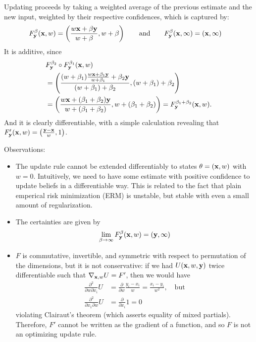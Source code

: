 \begin{subappendices}
\begin{example}
    	Updating proceeds by taking a weighted average of the previous estimate and the new input, weighted by their respective confidences, which is captured by:
    	\begin{align*}
    		F^\beta_{\mathbf y}(\mathbf x, w) &=  \left( \frac{ w \mathbf x + \beta \mathbf y}{w + \beta} , w + \beta \right)
    		\qquad\text{and}\qquad
    		F^{\beta}_{\mathbf y}(\mathbf x, \infty) = (\mathbf x, \infty)
    	\end{align*}
    	It is additive, since
    	\begin{align*}
    		&F^{\beta_2}_{\mathbf y} \circ F^{\beta_1}_{\mathbf y}(\mathbf x, w) \\
    		&= \left( \frac{ (w + \beta_1) \frac{ w \mathbf x + \beta_1 \mathbf y}{w + \beta_1} + \beta_2 \mathbf y}{(w + \beta_1) + \beta_2}, (w  + \beta_1) + \beta_2 \right) \\
    		&= \left( \frac{  w \mathbf x + (\beta_1 + \beta_2) \mathbf y}{w + (\beta_1 + \beta_2)}, w  + (\beta_1 + \beta_2)\right)
    		= F^{\beta_1 + \beta_2}_{\mathbf y}(\mathbf x, w).
    	\end{align*}
    	And it is clearly differentiable, with a simple calculation revealing that
    	$ F'_{\mathbf y}(\mathbf x, w) = \left( \frac{\mathbf y - \mathbf x}{w}, 1\right) $.

    	Observations:
    	\begin{itemize}
    		\item The update rule cannot be extended differentiably to states $\theta = (\mathbf x, w)$ with $w = 0$.
    			Intuitively, we need to have some estimate with positive confidence to update beliefs in a differentiable way.
            This is related to the fact that plain emperical risk minimization (ERM) is unstable, but stable with even a small amount of regularization.
    		\item The certainties are given by
    		\[
    			\lim_{\beta \to \infty} F^{\beta}_{\mathbf y}(\mathbf x, w) = (\mathbf y, \infty)
    		\]
    		\item $F$ is commutative, invertible, and symmetric with respect to permutation of the dimensions, but it is not conservative: if we had $U(\mathbf x, w, \mathbf y)$ twice differentiable such that $\nabla_{\mathbf x, w} U = F'$, then we would have
            \begin{align*}
            \frac{\partial^2}{\partial w \partial x_i} U &=
    			\frac\partial{\partial w} \frac{y_i - x_i}{w} = \frac{x_i - y_i}{w^2},\quad\text{but}
                \\
    		\frac{\partial^2}{\partial x_1 \partial w} U
    			&= \frac\partial{\partial x_i} 1 = 0    
            \end{align*}
    		violating Clairaut's theorem (which asserts equality of mixed partials).
    		Therefore, $F'$ cannot be written as the gradient of a function,
            and so $F$ is not an optimizing update rule. \qedhere
    	\end{itemize}
    \end{example}


\end{subappendices}
